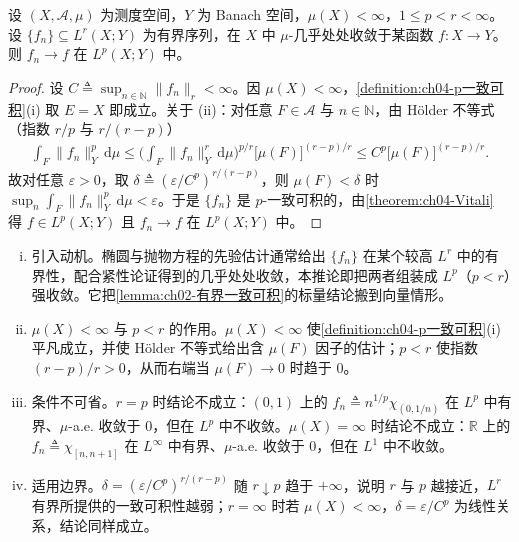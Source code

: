\documentclass[../../main.tex]{subfiles}%
\begin{document}
\begin{corollary}\label{corollary:ch04-有界收敛}
设 $(X,\mathcal{A},\mu)$ 为测度空间，$Y$ 为 Banach 空间，$\mu(X)<\infty$，$1\leqslant p<r<\infty$。设 $\{f_n\}\subseteq L^r(X;Y)$ 为有界序列，在 $X$ 中 $\mu$-几乎处处收敛于某函数 $f:X\to Y$。则 $f_n\to f$ 在 $L^p(X;Y)$ 中。
\end{corollary}

\begin{proof}
设 $C\triangleq\sup_{n\in\mathbb{N}}\|f_n\|_r<\infty$。因 $\mu(X)<\infty$，\cref{definition:ch04-p一致可积}(i) 取 $E=X$ 即成立。关于 (ii)：对任意 $F\in\mathcal{A}$ 与 $n\in\mathbb{N}$，由 Hölder 不等式（指数 $r/p$ 与 $r/(r-p)$）
\begin{align*}
\int_F\|f_n\|_Y^p\,\mathrm{d}\mu\leqslant\Big(\int_F\|f_n\|_Y^r\,\mathrm{d}\mu\Big)^{p/r}\big[\mu(F)\big]^{(r-p)/r}\leqslant C^p\big[\mu(F)\big]^{(r-p)/r}.
\end{align*}
故对任意 $\varepsilon>0$，取 $\delta\triangleq(\varepsilon/C^p)^{r/(r-p)}$，则 $\mu(F)<\delta$ 时 $\sup_n\int_F\|f_n\|_Y^p\,\mathrm{d}\mu<\varepsilon$。于是 $\{f_n\}$ 是 $p$-一致可积的，由\cref{theorem:ch04-Vitali} 得 $f\in L^p(X;Y)$ 且 $f_n\to f$ 在 $L^p(X;Y)$ 中。
\end{proof}

\begin{remark}
\begin{enumerate}[(i)]
\item 引入动机。椭圆与抛物方程的先验估计通常给出 $\{f_n\}$ 在某个较高 $L^r$ 中的有界性，配合紧性论证得到的几乎处处收敛，本推论即把两者组装成 $L^p$（$p<r$）强收敛。它把\cref{lemma:ch02-有界一致可积}的标量结论搬到向量情形。

\item $\mu(X)<\infty$ 与 $p<r$ 的作用。$\mu(X)<\infty$ 使\cref{definition:ch04-p一致可积}(i) 平凡成立，并使 Hölder 不等式给出含 $\mu(F)$ 因子的估计；$p<r$ 使指数 $(r-p)/r>0$，从而右端当 $\mu(F)\to0$ 时趋于 $0$。

\item 条件不可省。$r=p$ 时结论不成立：$(0,1)$ 上的 $f_n\triangleq n^{1/p}\chi_{(0,1/n)}$ 在 $L^p$ 中有界、$\mu$-a.e. 收敛于 $0$，但在 $L^p$ 中不收敛。$\mu(X)=\infty$ 时结论不成立：$\mathbb{R}$ 上的 $f_n\triangleq\chi_{[n,n+1]}$ 在 $L^\infty$ 中有界、$\mu$-a.e. 收敛于 $0$，但在 $L^1$ 中不收敛。

\item 适用边界。$\delta=(\varepsilon/C^p)^{r/(r-p)}$ 随 $r\downarrow p$ 趋于 $+\infty$，说明 $r$ 与 $p$ 越接近，$L^r$ 有界所提供的一致可积性越弱；$r=\infty$ 时若 $\mu(X)<\infty$，$\delta=\varepsilon/C^p$ 为线性关系，结论同样成立。
\end{enumerate}
\end{remark}
\end{document}
